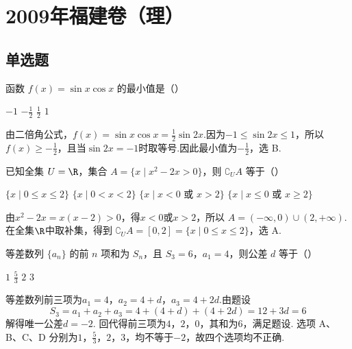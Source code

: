 \chapter{2009年福建卷（理）}

\section{单选题}

\begin{problem}
函数 \( f(x) = \sin x\cos x \) 的最小值是（\quad）

\choices
    {\(-1\)}
    {\(-\frac{1}{2}\)}
    {\( \frac{1}{2} \)}
    {\(1\)}

\begin{solution}
由二倍角公式，\(f(x)=\sin x\cos x=\frac{1}{2}\sin 2x\).因为\(-1\leqslant\sin 2x\leqslant1\)，所以
\(f(x)\geqslant-\frac{1}{2}\)，且当\(\sin 2x=-1\)时取等号.因此最小值为\(-\frac{1}{2}\)，选 B.
\end{solution}
\end{problem}

\begin{problem}
已知全集 \(U = \R\)，集合 \(A = \{x \mid x^2 - 2x > 0\}\)，则 \(\complement_U A\) 等于（\quad）

\choices
    {\(\{x\mid 0\leqslant x\leqslant 2\}\)}
    {\(\{x\mid 0 < x < 2\}\)}
    {\(\{x\mid x < 0\text{ 或 }x > 2\}\)}
    {\(\{x\mid x\leqslant 0\text{ 或 }x\geqslant 2\}\)}

\begin{solution}
由\(x^2-2x=x(x-2)>0\)，得\(x<0\)或\(x>2\)，所以
\(A=(-\infty,0)\cup(2,+\infty)\).在全集\(\R\)中取补集，得到
\(\complement_U A=[0,2]=\{x\mid 0\leqslant x\leqslant2\}\)，选 A.
\end{solution}
\end{problem}

\begin{problem}
等差数列 \(\{a_{n}\}\) 的前 \(n\) 项和为 \(S_{n}\)，且 \(S_{3} = 6\)，\(a_{1} = 4\)，则公差 \(d\) 等于（\quad）

\choices
    {\(1\)}
    {\( \frac{5}{3} \)}
    {\(2\)}
    {\(3\)}

\begin{solution}
等差数列前三项为\(a_1=4\)，\(a_2=4+d\)，\(a_3=4+2d\).由题设
\[
S_3=a_1+a_2+a_3=4+(4+d)+(4+2d)=12+3d=6
\]
解得唯一公差\(d=-2\). 回代得前三项为\(4\)，\(2\)，\(0\)，其和为\(6\)，满足题设. 选项 A、B、C、D 分别为\(1\)，\(\frac{5}{3}\)，\(2\)，\(3\)，均不等于\(-2\)，故四个选项均不正确.
\end{solution}
\end{problem}

